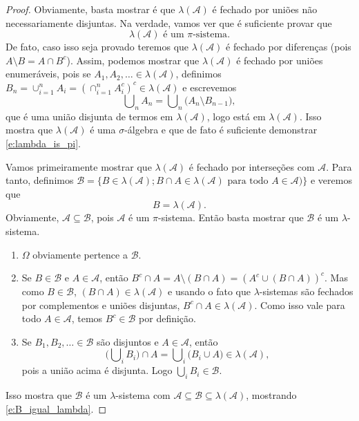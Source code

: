 \documentclass[reqno, final]{book}
\newcommand*\1{\mathds{1}}
\DeclareMathOperator*{\mcup}{{\textstyle \bigcup}}
\begin{document}
\begin{proof}
  Obviamente, basta mostrar é que $\lambda(\mathcal{A})$ é fechado por uniões não necessariamente disjuntas.
  Na verdade, vamos ver que é suficiente provar que
  \begin{equation}
    \label{e:lambda_is_pi}
    \lambda(\mathcal{A}) \text{ é um $\pi$-sistema}.
  \end{equation}
  De fato, caso isso seja provado teremos que $\lambda(\mathcal{A})$ é fechado por diferenças (pois $A \setminus B = A \cap B^c$).
  Assim, podemos mostrar que $\lambda(\mathcal{A})$ é fechado por uniões enumeráveis, pois se $A_1, A_2, \dots \in \lambda(\mathcal{A})$, definimos $B_n = \cup_{i=1}^n A_i = (\cap_{i=1}^n A_i^c)^c \in \lambda(\mathcal{A})$ e escrevemos
  \begin{equation}
    \mcup_n A_n = \mcup_n \big(A_n \setminus B_{n-1} \big),
  \end{equation}
  que é uma união disjunta de termos em $\lambda(\mathcal{A})$, logo está em $\lambda(\mathcal{A})$.
  Isso mostra que $\lambda(\mathcal{A})$ é uma $\sigma$-álgebra e que de fato é suficiente demonstrar \eqref{e:lambda_is_pi}.

  Vamos primeiramente mostrar que $\lambda(\mathcal{A})$ é fechado por interseções com $\mathcal{A}$.
  Para tanto, definimos $\mathcal{B} = \big\{B \in \lambda(\mathcal{A}); \text{$B \cap A \in \lambda(\mathcal{A})$ para todo $A \in \mathcal{A}$})\big\}$ e veremos que
  \begin{equation}
    \label{e:B_igual_lambda}
    B = \lambda(\mathcal{A}).
  \end{equation}
  Obviamente, $\mathcal{A} \subseteq \mathcal{B}$, pois $\mathcal{A}$ é um $\pi$-sistema.
  Então basta mostrar que $\mathcal{B}$ é um $\lambda$-sistema.
  \begin{enumerate}[\quad a)]
  \item $\Omega$ obviamente pertence a $\mathcal{B}$.
  \item Se $B \in \mathcal{B}$ e $A \in \mathcal{A}$, então $B^c \cap A = A \setminus(B \cap A) = (A^c \cup (B \cap A))^c$.
    Mas como $B \in \mathcal{B}$, $(B \cap A) \in \lambda(\mathcal{A})$ e usando o fato que $\lambda$-sistemas são fechados por complementos e uniões disjuntas, $B^c \cap A \in \lambda(\mathcal{A})$.
    Como isso vale para todo $A \in \mathcal{A}$, temos $B^c \in \mathcal{B}$ por definição.
  \item Se $B_1, B_2, \dots \in \mathcal{B}$ são disjuntos e $A \in \mathcal{A}$, então
    \begin{equation}
      \big(\mcup\nolimits_i B_i \big) \cap A = \mcup_i \big(B_i \cup A\big) \in \lambda(\mathcal{A}),
    \end{equation}
    pois a união acima é disjunta.
    Logo $\mcup_i B_i \in \mathcal{B}$.
  \end{enumerate}
  Isso mostra que $\mathcal{B}$ é um $\lambda$-sistema com $\mathcal{A} \subseteq \mathcal{B} \subseteq \lambda(\mathcal{A})$, mostrando \eqref{e:B_igual_lambda}.


\end{proof}
\end{document}

